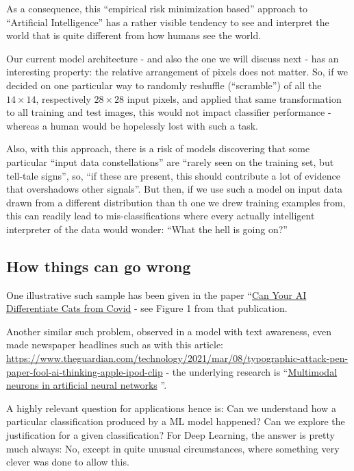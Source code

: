 \documentclass[11pt]{article}
\begin{document}
As a consequence, this ``empirical risk minimization based'' approach to
``Artificial Intelligence'' has a rather visible tendency to see and
interpret the world that is quite different from how humans see the
world.

Our current model architecture - and also the one we will discuss next -
has an interesting property: the relative arrangement of pixels does not
matter. So, if we decided on one particular way to randomly reshuffle
(``scramble'') of all the \(14\times 14\), respectively \(28\times 28\)
input pixels, and applied that same transformation to all training and
test images, this would not impact classifier performance - whereas a
human would be hopelessly lost with such a task.

Also, with this approach, there is a risk of models discovering that
some particular ``input data constellations'' are ``rarely seen on the
training set, but tell-tale signs'', so, ``if these are present, this
should contribute a lot of evidence that overshadows other signals''.
But then, if we use such a model on input data drawn from a different
distribution than th one we drew training examples from, this can
readily lead to mis-classifications where every actually intelligent
interpreter of the data would wonder: ``What the hell is going on?''

\hypertarget{how-things-can-go-wrong}{%
\subsection{How things can go wrong}\label{how-things-can-go-wrong}}

One illustrative such sample has been given in the paper
``\href{https://www.semanticscholar.org/paper/Can-Your-AI-Differentiate-Cats-from-Covid-19Sample-Mallick-Dwivedi/c100c33afbb2efa5197f7d6042022e1227c5e298}{Can
Your AI Differentiate Cats from Covid} \cite{mallick2020can} - see Figure 1 from that
publication.

Another similar such problem, observed in a model with text awareness,
even made newspaper headlines such as with this article:
\url{https://www.theguardian.com/technology/2021/mar/08/typographic-attack-pen-paper-fool-ai-thinking-apple-ipod-clip}
- the underlying research is
``\href{https://distill.pub/2021/multimodal-neurons/}{Multimodal neurons
in artificial neural networks} \cite{goh2021multimodal}''.

A highly relevant question for applications hence is: Can we understand
how a particular classification produced by a ML model happened? Can we
explore the justification for a given classification? For Deep Learning,
the answer is pretty much always: No, except in quite unusual
circumstances, where something very clever was done to allow this.
\end{document}
